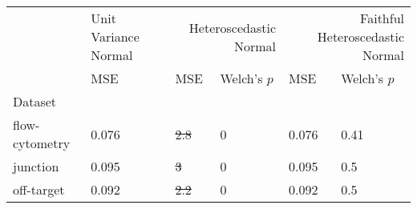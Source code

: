 \begin{tabular}{l|l|ll|ll}
\toprule
 & Unit Variance Normal & \multicolumn{2}{r}{Heteroscedastic Normal} & \multicolumn{2}{r}{Faithful Heteroscedastic Normal} \\
 & MSE & MSE & Welch's $p$ & MSE & Welch's $p$ \\
Dataset &  &  &  &  &  \\
\midrule
flow-cytometry & 0.076 & \sout{2.8} & 0 & 0.076 & 0.41 \\
junction & 0.095 & \sout{3} & 0 & 0.095 & 0.5 \\
off-target & 0.092 & \sout{2.2} & 0 & 0.092 & 0.5 \\
\bottomrule
\end{tabular}
